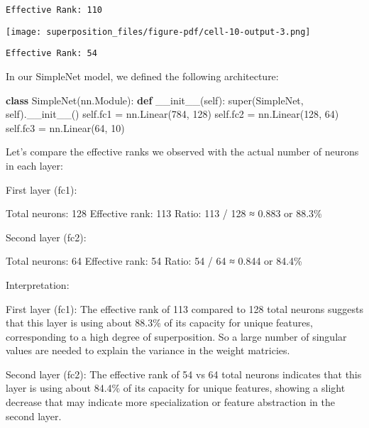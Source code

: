 \documentclass[
  letterpaper,
  DIV=11,
  numbers=noendperiod]{scrreprt}
\newenvironment{Shaded}{\begin{snugshade}}{\end{snugshade}}
\newcommand{\BuiltInTok}[1]{\textcolor[rgb]{0.00,0.23,0.31}{#1}}
\newcommand{\DecValTok}[1]{\textcolor[rgb]{0.68,0.00,0.00}{#1}}
\newcommand{\FunctionTok}[1]{\textcolor[rgb]{0.28,0.35,0.67}{#1}}
\newcommand{\KeywordTok}[1]{\textcolor[rgb]{0.00,0.23,0.31}{\textbf{#1}}}
\newcommand{\NormalTok}[1]{\textcolor[rgb]{0.00,0.23,0.31}{#1}}
\newcommand{\OperatorTok}[1]{\textcolor[rgb]{0.37,0.37,0.37}{#1}}
\newcommand{\VariableTok}[1]{\textcolor[rgb]{0.07,0.07,0.07}{#1}}
\begin{document}
\begin{verbatim}
Effective Rank: 110
\end{verbatim}

\texttt{[image: superposition\_files/figure-pdf/cell-10-output-3.png]}

\begin{verbatim}
Effective Rank: 54
\end{verbatim}

In our SimpleNet model, we defined the following architecture:

\begin{Shaded}
\begin{Highlighting}[]

\KeywordTok{class}\NormalTok{ SimpleNet(nn.Module):}
    \KeywordTok{def} \FunctionTok{\_\_init\_\_}\NormalTok{(}\VariableTok{self}\NormalTok{):}
        \BuiltInTok{super}\NormalTok{(SimpleNet, }\VariableTok{self}\NormalTok{).}\FunctionTok{\_\_init\_\_}\NormalTok{()}
        \VariableTok{self}\NormalTok{.fc1 }\OperatorTok{=}\NormalTok{ nn.Linear(}\DecValTok{784}\NormalTok{, }\DecValTok{128}\NormalTok{)}
        \VariableTok{self}\NormalTok{.fc2 }\OperatorTok{=}\NormalTok{ nn.Linear(}\DecValTok{128}\NormalTok{, }\DecValTok{64}\NormalTok{)}
        \VariableTok{self}\NormalTok{.fc3 }\OperatorTok{=}\NormalTok{ nn.Linear(}\DecValTok{64}\NormalTok{, }\DecValTok{10}\NormalTok{)}
\end{Highlighting}
\end{Shaded}

Let's compare the effective ranks we observed with the actual number of
neurons in each layer:

First layer (fc1):

Total neurons: 128 Effective rank: 113 Ratio: 113 / 128 ≈ 0.883 or
88.3\%

Second layer (fc2):

Total neurons: 64 Effective rank: 54 Ratio: 54 / 64 ≈ 0.844 or 84.4\%

Interpretation:

First layer (fc1): The effective rank of 113 compared to 128 total
neurons suggests that this layer is using about 88.3\% of its capacity
for unique features, corresponding to a high degree of superposition. So
a large number of singular values are needed to explain the variance in
the weight matricies.

Second layer (fc2): The effective rank of 54 vs 64 total neurons
indicates that this layer is using about 84.4\% of its capacity for
unique features, showing a slight decrease that may indicate more
specialization or feature abstraction in the second layer.
\end{document}
